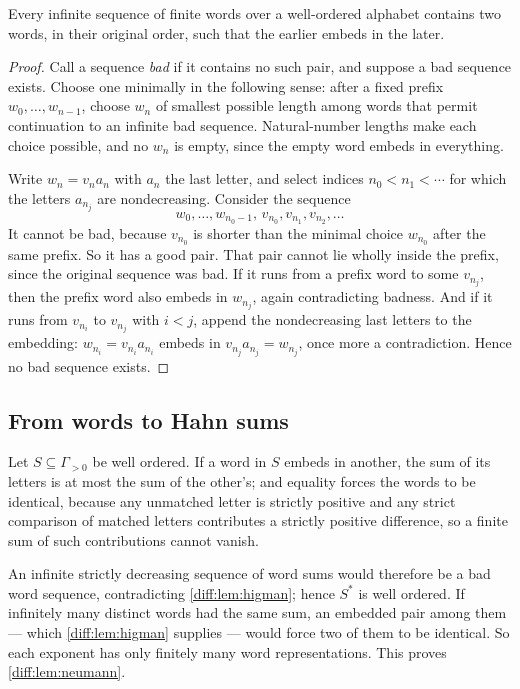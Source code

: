 \documentclass[11pt,letterpaper]{article}
\numberwithin{equation}{section}
\theoremstyle{definition}
\theoremstyle{remark}
\begin{document}
\begin{lemma}
\label{diff:lem:higman}
Every infinite sequence of finite words over a well-ordered alphabet contains
two words, in their original order, such that the earlier embeds in the later.
\end{lemma}
\begin{proof}
Call a sequence \emph{bad} if it contains no such pair, and suppose a bad
sequence exists. Choose one minimally in the following sense: after a fixed
prefix $w_{0},\dots,w_{n-1}$, choose $w_{n}$ of smallest possible length among
words that permit continuation to an infinite bad sequence. Natural-number
lengths make each choice possible, and no $w_{n}$ is empty, since the empty
word embeds in everything.

Write $w_{n}=v_{n}a_{n}$ with $a_{n}$ the last letter, and select indices
$n_{0}<n_{1}<\cdots$ for which the letters $a_{n_{j}}$ are nondecreasing.
Consider the sequence
\[
 w_{0},\dots,w_{n_{0}-1},\,v_{n_{0}},v_{n_{1}},v_{n_{2}},\dots
\]
It cannot be bad, because $v_{n_{0}}$ is shorter than the minimal choice
$w_{n_{0}}$ after the same prefix. So it has a good pair. That pair cannot lie
wholly inside the prefix, since the original sequence was bad. If it runs from
a prefix word to some $v_{n_{j}}$, then the prefix word also embeds in
$w_{n_{j}}$, again contradicting badness. And if it runs from $v_{n_{i}}$ to
$v_{n_{j}}$ with $i<j$, append the nondecreasing last letters to the
embedding: $w_{n_{i}}=v_{n_{i}}a_{n_{i}}$ embeds in
$v_{n_{j}}a_{n_{j}}=w_{n_{j}}$, once more a contradiction. Hence no bad
sequence exists.
\end{proof}

\subsection{From words to Hahn sums}
\label{diff:sub:app:towords}

Let $S\subseteq\Gamma_{>0}$ be well ordered. If a word in $S$ embeds in
another, the sum of its letters is at most the sum of the other's; and
equality forces the words to be identical, because any unmatched letter is
strictly positive and any strict comparison of matched letters contributes a
strictly positive difference, so a finite sum of such contributions cannot
vanish.

An infinite strictly decreasing sequence of word sums would therefore be a bad
word sequence, contradicting \cref{diff:lem:higman}; hence $S^{*}$ is well
ordered. If infinitely many distinct words had the same sum, an embedded pair
among them --- which \cref{diff:lem:higman} supplies --- would force two of
them to be identical. So each exponent has only finitely many word
representations. This proves \cref{diff:lem:neumann}.
\end{document}
